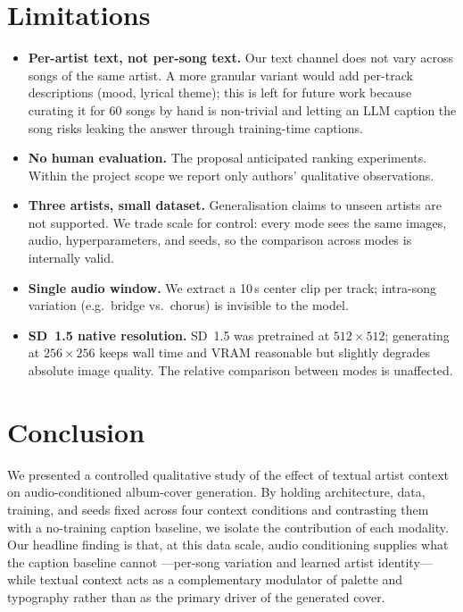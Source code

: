 \documentclass{article}
\begin{document}
\section{Limitations}
\label{sec:limits}

\begin{itemize}
\item \textbf{Per-artist text, not per-song text.} Our text channel does
  not vary across songs of the same artist. A more granular variant would
  add per-track descriptions (mood, lyrical theme); this is left for
  future work because curating it for 60 songs by hand is non-trivial and
  letting an LLM caption the song risks leaking the answer through
  training-time captions.
\item \textbf{No human evaluation.} The proposal anticipated ranking
  experiments. Within the project scope we report only authors' qualitative
  observations.
\item \textbf{Three artists, small dataset.} Generalisation claims to
  unseen artists are not supported. We trade scale for control: every
  mode sees the same images, audio, hyperparameters, and seeds, so the
  comparison across modes is internally valid.
\item \textbf{Single audio window.} We extract a 10\,s center clip per
  track; intra-song variation (e.g.\ bridge vs.\ chorus) is invisible to
  the model.
\item \textbf{SD~1.5 native resolution.} SD~1.5 was pretrained at
  $512\times 512$; generating at $256\times 256$ keeps wall time and VRAM
  reasonable but slightly degrades absolute image quality. The relative
  comparison between modes is unaffected.
\end{itemize}

\section{Conclusion}
\label{sec:conclusion}

We presented a controlled qualitative study of the effect of textual
artist context on audio-conditioned album-cover generation. By holding
architecture, data, training, and seeds fixed across four context
conditions and contrasting them with a no-training caption baseline, we
isolate the contribution of each modality. Our headline finding is that, at
this data scale, audio conditioning supplies what the caption baseline cannot
---per-song variation and learned artist identity---while textual context acts
as a complementary modulator of palette and typography rather than as the
primary driver of the generated cover.
\end{document}
